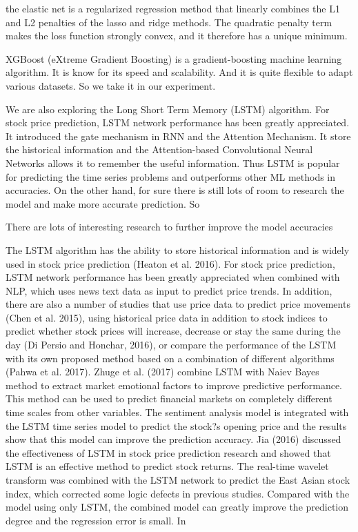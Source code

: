 \documentclass[11pt]{article}
\begin{document}
 the elastic net is a regularized regression method that linearly combines the L1 and L2 penalties of the lasso and ridge methods. 
 The quadratic penalty term makes the loss function strongly convex, and it therefore has a unique minimum.
 
 XGBoost (eXtreme Gradient Boosting) is a gradient-boosting machine learning algorithm. It is know for its speed and scalability.
 And it is quite flexible to adapt various datasets. So we take it in our experiment.

We are also exploring the Long Short Term Memory (LSTM) algorithm. For stock price prediction, LSTM network performance has
been greatly appreciated. It introduced the gate mechanism in RNN and the Attention Mechanism.
It store the historical information and the Attention-based Convolutional Neural Networks allows it to remember the useful information.
Thus LSTM is popular for predicting the time series problems and outperforms other ML methods in accuracies. 
On the other hand, for sure there is still lots of room to research the model and make more accurate prediction. 
So  


There are lots of interesting research to further improve the model accuracies 



The LSTM algorithm
has the ability to store historical information and is widely used in
stock price prediction (Heaton et al. 2016).
For stock price prediction, LSTM network performance has
been greatly appreciated when combined with NLP, which uses
news text data as input to predict price trends. In addition, there
are also a number of studies that use price data to predict price
movements (Chen et al. 2015), using historical price data in
addition to stock indices to predict whether stock prices will
increase, decrease or stay the same during the day (Di Persio and
Honchar, 2016), or compare the performance of the LSTM with
its own proposed method based on a combination of different
algorithms (Pahwa et al. 2017).
Zhuge et al. (2017) combine LSTM with Naiev Bayes method
to extract market emotional factors to improve predictive
performance. This method can be used to predict financial
markets on completely different time scales from other variables.
The sentiment analysis model is integrated with the LSTM time
series model to predict the stock?s opening price and the results
show that this model can improve the prediction accuracy.
Jia (2016) discussed the effectiveness of LSTM in stock price
prediction research and showed that LSTM is an effective method
to predict stock returns. The real-time wavelet transform was
combined with the LSTM network to predict the East Asian stock
index, which corrected some logic defects in previous studies.
Compared with the model using only LSTM, the combined model
can greatly improve the prediction degree and the regression error
is small. In
\end{document}
